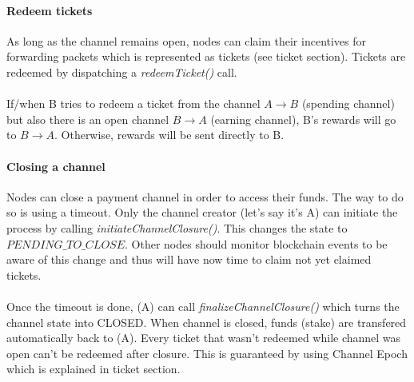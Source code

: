 \paragraph{Redeem tickets}
As long as the channel remains open, nodes can claim their incentives for forwarding packets which is represented as tickets (see ticket section). Tickets are redeemed by dispatching a \textit{redeemTicket()} call.
\\~\\If/when B tries to redeem a ticket from the channel $A\rightarrow B$ (spending channel) but also there is an open channel $B\rightarrow A$ (earning channel), B's rewards will go to $B\rightarrow A$. Otherwise, rewards will be sent directly to B.

\paragraph{Closing a channel}
Nodes can close a payment channel in order to access their funds. The way to do so is using a timeout.
Only the channel creator (let's say it's A) can initiate the process by calling \textit{initiateChannelClosure()}. This changes the state to $PENDING\_TO\_CLOSE$. Other nodes should monitor blockchain events to be aware of this change and thus will have now time to claim not yet claimed tickets.
\\~\\Once the timeout is done, (A) can call \textit{finalizeChannelClosure()} which turns the channel state into CLOSED. When channel is closed, funds (stake) are transfered automatically back to (A). Every ticket that wasn't redeemed while channel was open can't be redeemed after closure. This is guaranteed by using Channel Epoch which is explained in ticket section.

